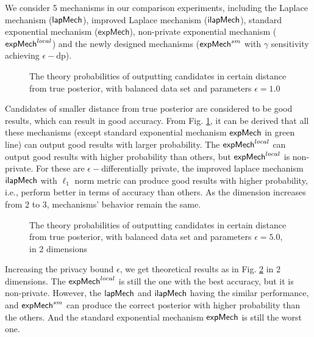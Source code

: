 \documentclass{article}
\begin{document}
We consider 5 mechanisms in our comparison experiments, including the Laplace mechanism ($\mathsf{lapMech}$), improved Laplace mechanism ($\mathsf{ilapMech}$), standard exponential mechanism ($\mathsf{expMech}$), non-private exponential mechanism ($\mathsf{expMech}^{local}$) and the newly designed mechanisms ($\mathsf{expMech}^{sm}$ with $\gamma$ sensitivity achieving $\epsilon-$dp).

\begin{figure}
\begin{center}
\centering
\caption{The theory probabilities of outputting candidates in certain distance from true posterior, with balanced data set and parameters $\epsilon = 1.0$}
\label{fig_theory}
\end{center}
\end{figure}

Candidates of smaller distance from true posterior are considered to be good results, which can result in good accuracy. From Fig. \ref{fig_theory}, it can be derived that all these mechanisms (except standard exponential mechanism $\mathsf{expMech}$ in green line) can output good results with larger probability. The $\mathsf{expMech}^{local}$ can output good results with higher probability than others, but $\mathsf{expMech}^{local}$ is non-private. For these are $\epsilon -$differentially private, the improved laplace mechanism $\mathsf{ilapMech}$ with $\ell_1$ norm metric can produce good results with higher probability, i.e., perform better in terms of accuracy than others. As the dimension increases from 2 to 3, mechanisms' behavior remain the same.

\begin{figure}
\begin{center}
\centering
\caption{The theory probabilities of outputting candidates in certain distance from true posterior, with balanced data set and parameters $\epsilon = 5.0$, in 2 dimensions}
\label{fig_theory_epsilon}
\end{center}
\end{figure}

Increasing the privacy bound $\epsilon$, we get theoretical results as in Fig. \ref{fig_theory_epsilon} in 2 dimensions. The $\mathsf{expMech}^{local}$ is still the one with the best accuracy, but it is non-private. However, the $\mathsf{lapMech}$ and $\mathsf{ilapMech}$ having the similar performance, and $\mathsf{expMech}^{sm}$ can produce the correct posterior with higher probability than the others. And the standard exponential mechanism $\mathsf{expMech}$ is still the worst one.
\end{document}
